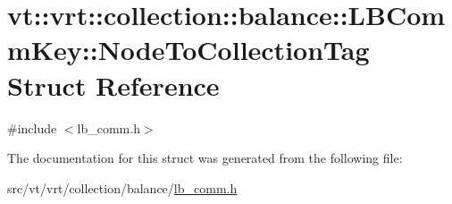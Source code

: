 \hypertarget{structvt_1_1vrt_1_1collection_1_1balance_1_1_l_b_comm_key_1_1_node_to_collection_tag}{}\section{vt\+:\+:vrt\+:\+:collection\+:\+:balance\+:\+:L\+B\+Comm\+Key\+:\+:Node\+To\+Collection\+Tag Struct Reference}
\label{structvt_1_1vrt_1_1collection_1_1balance_1_1_l_b_comm_key_1_1_node_to_collection_tag}


{\ttfamily \#include $<$lb\+\_\+comm.\+h$>$}



The documentation for this struct was generated from the following file\+:\begin{DoxyCompactItemize}
\item 
src/vt/vrt/collection/balance/\hyperlink{lb__comm_8h}{lb\+\_\+comm.\+h}\end{DoxyCompactItemize}
